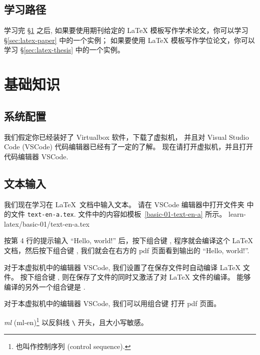 \documentclass[
    11pt,
    base=hide,
    cite=authoryear,
    device=phone,
    lang=cn,
    mode=simple,
    result=answer,
    toc=onecol,
]{elegantsierxue310}
\begin{document}
\subsection*{学习路径}%
\label{sec:latex-learning}

学习完 \S\ref{sec:latex-basic} 之后,
如果要使用期刊给定的 \LaTeX{} 模板写作学术论文，你可以学习
\S\ref{sec:latex-paper} 中的一个实例；
如果要使用 \LaTeX{} 模板写作学位论文，你可以学习
\S\ref{sec:latex-thesis} 中的一个实例。

\section{基础知识}%
\label{sec:latex-basic}

\subsection*{系统配置}%
\label{sub:vm-vscode}

我们假定你已经装好了 Virtualbox 软件，下载了虚拟机，
并且对 Visual Studio Code (VSCode) 代码编辑器已经有了一定的了解。
现在请打开虚拟机，并且打开代码编辑器 VSCode.

\subsection{文本输入}%
\label{sub:latex-text}

我们现在学习在 \LaTeX\ 文档中输入文本。
请在 VSCode 编辑器中打开文件夹 
中的文件 \texttt{text-en-a.tex}.
文件中的内容如模板~\ref{basic-01-text-en-a} 所示。
%
{learn-latex/basic-01/text-en-a.tex}

按第 4 行的提示输入 ``Hello, world!'' 后，按下组合键 ,
程序就会编译这个 {\LaTeX} 文档，然后按下组合键 ,
我们就会在右方的 pdf 页面看到输出的 ``Hello, world!''.
\begin{tip}\label{tip:vscode-shortcut-compile}
    对于本虚拟机中的编辑器 VSCode,
    我们设置了在保存文件时自动编译 {\LaTeX} 文件。
    按下组合键 ,
    则在保存了文件的同时又激活了对 {\LaTeX} 文件的编译。
    能够编译的另外一个组合键是 .
\end{tip}
\begin{tip}\label{tip:vscode-shortcut-pdfviewer}
    对于本虚拟机中的编辑器 VSCode,
    我们可以用组合键  打开 pdf 页面。
\end{tip}
\begin{latex}\label{tex:command}
    \emph{\gls{ml}} (\gls{ml-en})\footnote{
        也叫作控制序列 (control sequence).}
    以反斜线 \texttt{\textbackslash}
    开头，且大小写敏感。
\end{latex}
\end{document}
